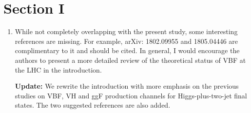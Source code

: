 \documentclass[12pt]{article}
\begin{document}
\section*{Section I}
\begin{enumerate}
\item While not completely overlapping with the present study, some interesting references are missing. For example, arXiv: 1802.09955 and 1805.04446 are complimentary to it and should be cited. In general, I would encourage the authors to present a more detailed review of the theoretical status of VBF at the LHC in the introduction.

{\bf Update:} We rewrite the introduction with more emphasis on the previous studies on VBF, VH and ggF production channels for Higgs-plus-two-jet final states. The two suggested references are also added.

\end{enumerate}
\end{document}
